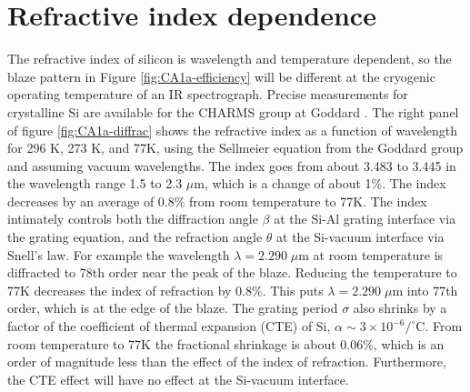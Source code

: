\section{Refractive index dependence}
The refractive index of silicon is wavelength and temperature dependent, so the blaze pattern in Figure \ref{fig:CA1a-efficiency} will be different at the cryogenic operating temperature of an IR spectrograph.  Precise measurements for crystalline Si are available for the CHARMS group at Goddard \cite{2006SPIE.6273E..77F}.  The right panel of figure \ref{fig:CA1a-diffrac} shows the refractive index as a function of wavelength for 296 K, 273 K, and 77K, using the Sellmeier equation from the Goddard group and assuming vacuum wavelengths.  The index goes from about 3.483 to 3.445 in the wavelength range 1.5 to 2.3 $\mu$m, which is a change of about 1\%.  The index decreases by an average of 0.8\% from room temperature to 77K.  The index intimately controls both the diffraction angle $\beta$ at the Si-Al grating interface via the grating equation, and the refraction angle $\theta$ at the Si-vacuum interface via Snell's law.  For example the wavelength $\lambda=2.290 \;\mu$m at room temperature is diffracted to 78th order near the peak of the blaze.  Reducing the temperature to 77K decreases the index of refraction by 0.8\%. This puts $\lambda= 2.290 \;\mu $m into 77th order, which is at the edge of the blaze.  The grating period $\sigma$ also shrinks by a factor of the coefficient of thermal expansion (CTE) of Si, $\alpha \sim 3\times10^{-6}/^\circ$C.  From room temperature to 77K the fractional shrinkage is about 0.06\%, which is an order of magnitude less than the effect of the index of refraction.  Furthermore, the CTE effect will have no effect at the Si-vacuum interface.


